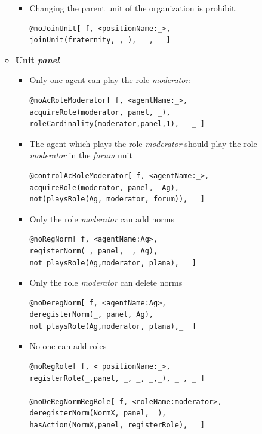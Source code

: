 \begin{enumerate}
\begin{itemize}
\begin{itemize}
\item Changing the parent unit of the organization is prohibit.  
\begin{verbatim}
@noJoinUnit[ f, <positionName:_>, 
joinUnit(fraternity,_,_), _ , _ ] 
\end{verbatim}


\end{itemize}

\item \textbf{Unit \textit{panel}}
\begin{itemize}

\item  Only one agent can play the role \textit{moderator}:
\begin{verbatim}
@noAcRoleModerator[ f, <agentName:_>, 
acquireRole(moderator, panel, _),  
roleCardinality(moderator,panel,1),   _ ]
\end{verbatim}

\item The agent which plays the role \textit{moderator} should play the role \textit{moderator} in the \textit{forum} unit

\begin{verbatim} 
@controlAcRoleModerator[ f, <agentName:_>, 
acquireRole(moderator, panel,  Ag), 
not(playsRole(Ag, moderator, forum)), _ ]
\end{verbatim}

\item Only the role \textit{moderator} can add norms
\begin{verbatim}
@noRegNorm[ f, <agentName:Ag>, 
registerNorm(_, panel, _, Ag),
not playsRole(Ag,moderator, plana),_  ] 
\end{verbatim}

\item Only the role \textit{moderator} can delete norms
\begin{verbatim}
@noDeregNorm[ f, <agentName:Ag>, 
deregisterNorm(_, panel, Ag),
not playsRole(Ag,moderator, plana),_  ] 
\end{verbatim}

\item No one can add roles
\begin{verbatim}
@noRegRole[ f, < positionName:_>, 
registerRole(_,panel, _, _, _,_), _ , _ ] 

@noDeRegNormRegRole[ f, <roleName:moderator>, 
deregisterNorm(NormX, panel, _),
hasAction(NormX,panel, registerRole), _ ] 
\end{verbatim}



\end{itemize}
\end{itemize}
\end{enumerate}
